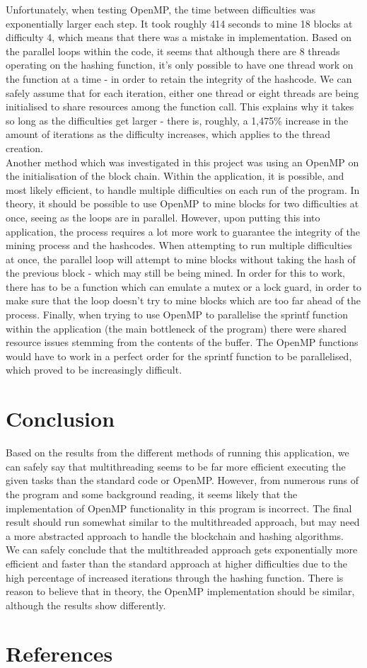 \documentclass[12pt, a4paper]{article}
\begin{document}
Unfortunately, when testing OpenMP, the time between difficulties was exponentially larger each step. It took roughly 414 seconds to mine 18 blocks at difficulty 4, which means that there was a mistake in implementation. Based on the parallel loops within the code, it seems that although there are 8 threads operating on the hashing function, it's only possible to have one thread work on the function at a time - in order to retain the integrity of the hashcode. We can safely assume that for each iteration, either one thread or eight threads are being initialised to share resources among the function call. This explains why it takes so long as the difficulties get larger - there is, roughly, a 1,475\% increase in the amount of iterations as the difficulty increases, which applies to the thread creation. \\
Another method which was investigated in this project was using an OpenMP on the initialisation of the block chain. Within the application, it is possible, and most likely efficient, to handle multiple difficulties on each run of the program. In theory, it should be possible to use OpenMP to mine blocks for two difficulties at once, seeing as the loops are in parallel. However, upon putting this into application, the process requires a lot more work to guarantee the integrity of the mining process and the hashcodes. When attempting to run multiple difficulties at once, the parallel loop will attempt to mine blocks without taking the hash of the previous block - which may still be being mined. In order for this to work, there has to be a function which can emulate a mutex or a lock guard, in order to make sure that the loop doesn't try to mine blocks which are too far ahead of the process. Finally, when trying to use OpenMP to parallelise the sprintf function within the application (the main bottleneck of the program) there were shared resource issues stemming from the contents of the buffer. The OpenMP functions would have to work in a perfect order for the sprintf function to be parallelised, which proved to be increasingly difficult.

\section{Conclusion}
Based on the results from the different methods of running this application, we can safely say that multithreading seems to be far more efficient executing the given tasks than the standard code or OpenMP. However, from numerous runs of the program and some background reading, it seems likely that the implementation of OpenMP functionality in this program is incorrect. The final result should run somewhat similar to the multithreaded approach, but may need a more abstracted approach to handle the blockchain and hashing algorithms. \\
We can safely conclude that the multithreaded approach gets exponentially more efficient and faster than the standard approach at higher difficulties due to the high percentage of increased iterations through the hashing function. There is reason to believe that in theory, the OpenMP implementation should be similar, although the results show differently.


\section{References}
\end{document}
